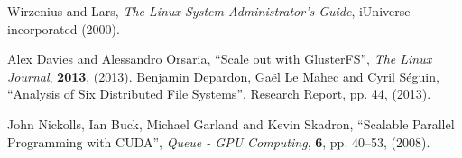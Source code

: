 \documentclass[twoside,a4paper,12pt,english]{inac17}
\begin{document}

\begin{thebibliography}{99} %

 Wirzenius and Lars, \textit{The  Linux System Administrator's Guide}, iUniverse incorporated (2000).


 Alex Davies and Alessandro Orsaria, ``Scale out with GlusterFS'', \textit{The Linux Journal}, \textbf{2013}, (2013).
 Benjamin Depardon, Ga\"{e}l Le Mahec and Cyril S\'{e}guin, ``Analysis of Six Distributed File Systems'', Research Report, pp. 44, (2013).

 John Nickolls, Ian Buck, Michael Garland and Kevin Skadron, ``Scalable Parallel Programming with CUDA'', \textit{Queue - GPU Computing}, \textbf{6}, pp. 40--53, (2008).





\end{thebibliography}


%
%
\end{document}
